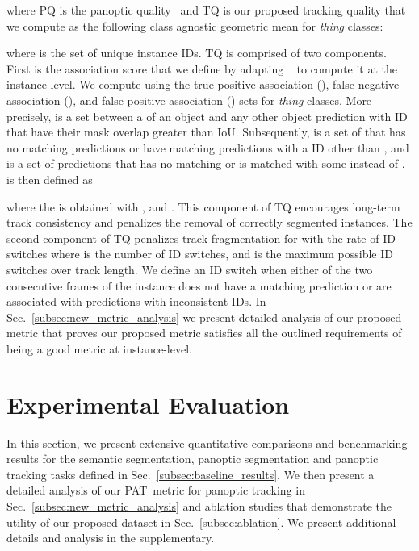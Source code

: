 \documentclass[letterpaper, 10 pt, journal, twoside]{IEEEtran}
\newcommand{\secref}[1]{Sec.~\ref{#1}}
\newcommand{\newmet}{PAT}
\begin{document}
where PQ is the panoptic quality~\cite{kirillov2019panoptic} and TQ is our proposed tracking quality that we compute as the following class agnostic geometric mean for \emph{thing} classes:

where  is the set of unique instance IDs. TQ is comprised of two components. First is the association score  that we define by adapting ~\cite{aygun20214d} to compute it at the instance-level. We compute  using the true positive association (), false negative association (), and false positive association () sets for \emph{thing} classes. More precisely,  is a set between a  of an object   and any other object prediction with ID  that have their mask overlap greater than  IoU. Subsequently,  is a set of   that has no matching predictions or have matching predictions with a ID other than , and  is a set of  predictions that has no matching  or is matched with some   instead of .  is then defined as

where the  is obtained with ,  and .
This component of TQ encourages long-term track consistency and penalizes the removal of correctly segmented instances. The second component of TQ penalizes track fragmentation for   with the rate of ID switches where  is the number of ID switches, and  is the maximum possible ID switches over  track length. We define an ID switch when either of the two consecutive frames of the instance  does not have a matching prediction or are associated with predictions with inconsistent IDs. In \secref{subsec:new_metric_analysis} we present detailed analysis of our proposed metric that proves our proposed metric satisfies all the outlined requirements of being a good metric at instance-level. 



%
 
\section{Experimental Evaluation}
\label{sec:experiments}

In this section, we present extensive quantitative comparisons and benchmarking results for the semantic segmentation, panoptic segmentation and panoptic tracking tasks defined in \secref{subsec:baseline_results}. We then present a detailed analysis of our \newmet~metric for panoptic tracking in \secref{subsec:new_metric_analysis} and ablation studies that demonstrate the utility of our proposed dataset in \secref{subsec:ablation}. We present additional details and analysis in the supplementary. 
\end{document}
